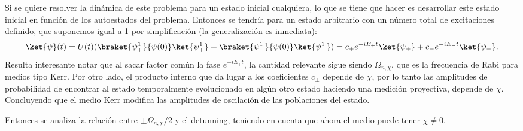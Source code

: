 Si se quiere resolver la dinámica de este problema para un estado inicial cualquiera, lo que se tiene que hacer es desarrollar este estado inicial en función de los autoestados del problema. Entonces se tendría para un estado arbitrario con un número total de excitaciones definido, que suponemos igual a 1 por simplificación (la generalización es inmediata):
\begin{equation}
    \ket{\psi}(t)=U(t)(\braket{\psi_+^1}{\psi(0)}\ket{\psi_+^1}+\braket{\psi_-^1}{\psi(0)}\ket{\psi_-^1})=c_+e^{-iE_+t}\ket{\psi_+}+c_-e^{-iE_-t}\ket{\psi_-}.
\end{equation}
Resulta interesante notar que al sacar factor común la fase $e^{-iE_+t}$, la cantidad relevante sigue siendo $\Omega_{n,\chi}$, que es la frecuencia de Rabi para medios tipo Kerr. Por otro lado, el producto interno que da lugar a los coeficientes $c_\pm$ depende de $\chi$, por lo tanto las amplitudes de probabilidad de encontrar al estado temporalmente evolucionado en algún otro estado haciendo una medición proyectiva, depende de $\chi$. Concluyendo que el medio Kerr modifica las amplitudes de oscilación de las poblaciones del estado.

Entonces se analiza la relación entre $\pm \Omega_{n,\chi}/2$ y el detunning, teniendo en cuenta que ahora el medio puede tener $\chi \neq 0$. 


